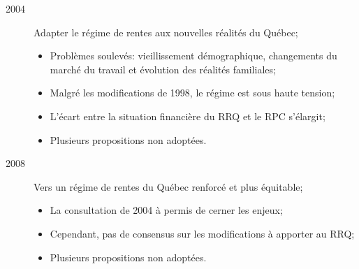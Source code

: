 \documentclass[10pt, french]{article}
\begin{document}
\begin{multicols*}{3}
\begin{rappel_enhanced}
\begin{description}
	\item[2004]	Adapter le régime de rentes aux nouvelles réalités du Québec;
		\begin{itemize}[leftmargin = *]
		\item	Problèmes soulevés: vieillissement démographique, changements du marché du travail et évolution des réalités familiales;
		\item	Malgré les modifications de 1998, le régime est sous haute tension;
		\item	L'écart entre la situation financière du RRQ et le RPC s'élargit;
		\item	Plusieurs propositions non adoptées.
		\end{itemize}
	\item[2008]	Vers un régime de rentes du Québec renforcé et plus équitable;
		\begin{itemize}[leftmargin = *]
		\item	La consultation de 2004 à permis de cerner les enjeux;
		\item	Cependant, pas de consensus sur les modifications à apporter au RRQ;
		\item	Plusieurs propositions non adoptées.
		\end{itemize}
\end{description}
\end{rappel_enhanced}


\end{multicols*}
\end{document}
